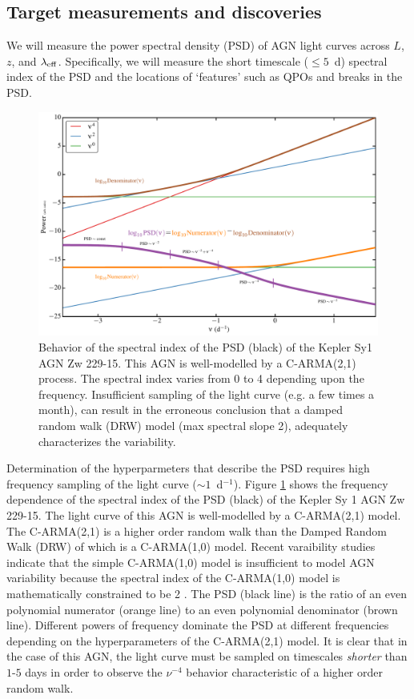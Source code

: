 
\subsection{Target measurements and discoveries}
\label{sec:\secname:targets}

We will measure the power spectral density (PSD) of AGN light 
curves across $L$, $z$, and $\lambda_{\rm eff}$. Specifically, we will
 measure the short timescale ($\leq 5$~d) spectral index of the PSD and
 the locations of `features' such as QPOs
 and breaks in the PSD.

\begin{figure}
\includegraphics[width=5.0in]{figs/agn/AGN_Variability_01.pdf}
\caption{Behavior of the spectral index of the PSD (black) of the Kepler Sy1 
AGN Zw 229-15. This AGN is well-modelled by a C-ARMA(2,1) process. The spectral index varies
from 0 to 4 depending upon the frequency. Insufficient sampling of the light
curve (e.g. a few times a month), can result in the erroneous conclusion that a 
damped random walk (DRW) model (max spectral slope 2), adequately 
characterizes the variability.
}
\label{PSDvsFreq}
\end{figure}

Determination of the hyperparmeters that describe the PSD requires high frequency
sampling of the light curve ($\sim 1$~d$^{-1}$). Figure \ref{PSDvsFreq} shows
the frequency dependence of the spectral index of the PSD (black) of the Kepler Sy 1 AGN 
Zw 229-15. The light curve of this AGN is well-modelled by a C-ARMA(2,1) 
model. The C-ARMA(2,1) is a higher order random walk than the 
Damped Random Walk (DRW) of \citet{Kelly09} which is a C-ARMA(1,0)
 model. Recent varaibility studies indicate that the simple C-ARMA(1,0) 
model is insufficient to model AGN variability because the spectral
 index of the C-ARMA(1,0)
model is mathematically constrained to be 2 \citep{Kelly14,Kasliwal15,Simm15}. 
The PSD (black line) is the ratio of an even polynomial numerator (orange line) to 
an even polynomial denominator (brown line). Different powers of frequency dominate
the PSD at different frequencies depending on the hyperparameters of the C-ARMA(2,1) model. It is
clear that in the case of this AGN, the light curve must be sampled on timescales {\em shorter} than 
$1$-$5$ days in order to observe the $\nu^{-4}$ behavior characteristic of a higher order random walk.

